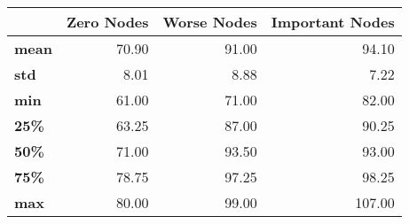 \begin{tabular}{lrrr}
\toprule
{} &  Zero Nodes &  Worse Nodes &  Important Nodes \\
\midrule
\textbf{mean} &       70.90 &        91.00 &            94.10 \\
\textbf{std } &        8.01 &         8.88 &             7.22 \\
\textbf{min } &       61.00 &        71.00 &            82.00 \\
\textbf{25\% } &       63.25 &        87.00 &            90.25 \\
\textbf{50\% } &       71.00 &        93.50 &            93.00 \\
\textbf{75\% } &       78.75 &        97.25 &            98.25 \\
\textbf{max } &       80.00 &        99.00 &           107.00 \\
\bottomrule
\end{tabular}
